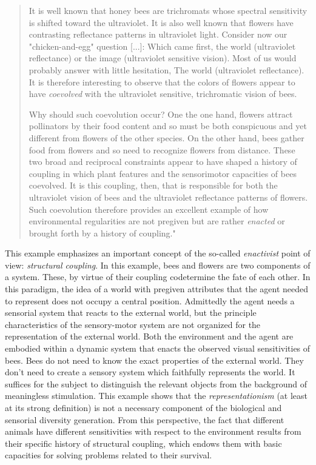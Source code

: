  
 \begin{quote} 
 
	It is well known that honey bees are trichromats whose spectral
	sensitivity is shifted toward the ultraviolet. It is also well known
	that flowers have contrasting reflectance patterns in ultraviolet
	light. Consider now our "chicken-and-egg" question [...]: Which came
	first, the world (ultraviolet reflectance) or the image (ultraviolet
	sensitive vision). Most of us would probably answer with little
	hesitation, The world (ultraviolet reflectance). It is therefore
	interesting to observe that the colors of flowers appear to have
	\textit{coevolved} with the ultraviolet sensitive, trichromatic vision
	of bees.

	Why should such coevolution occur? One the one hand, flowers attract
	pollinators by their food content and so must be both conspicuous and
	yet different from flowers of the other species. On the other hand,
	bees gather food from flowers and so need to recognize flowers from
	distance. These two broad and reciprocal constraints appear to have
	shaped a history of coupling in which plant features and the
	sensorimotor capacities of bees coevolved. It is this coupling, then,
	that is responsible for both the ultraviolet vision of bees and the
	ultraviolet reflectance patterns of flowers. Such coevolution therefore
	provides an excellent example of how environmental regularities are not
	pregiven but are rather \textit{enacted} or brought forth by a history
	of coupling."

 \end{quote}


This example emphasizes an important concept of the so-called
\textit{enactivist} point of view: \textit{structural coupling}. In this
example, bees and flowers are two components of a system. These, by virtue
of their coupling codetermine the fate of each other. In this paradigm, the
idea of a world with pregiven attributes that the agent needed to represent
does not occupy a central position. Admittedly the agent needs a sensorial
system that reacts to the external world, but the principle characteristics
of the sensory-motor system are not organized for the representation of the
external world. Both the environment and the agent are embodied within a
dynamic system that enacts the observed visual sensitivities of bees. Bees
do not need to know the exact properties of the external world. They don't
need to create a sensory system which faithfully represents the world. It
suffices for the subject to distinguish the relevant objects from the
background of meaningless stimulation. This example shows that the
\textit{representationism} (at least at its strong definition) is not a
necessary component of the biological and sensorial diversity generation.
From this perspective, the fact that different animals have different
sensitivities with respect to the environment results from their specific
history of structural coupling, which endows them with basic capacities for
solving problems related to their survival.



